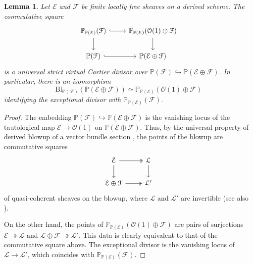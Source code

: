 \documentclass{amsart}
\numberwithin{equation}{section}
\theoremstyle{plain}
\newtheorem{lemma}[equation]{Lemma}
\theoremstyle{definition}
\newtheorem{remark}[equation]{Remark}
\let\scr=\mathcal
\let\bb=\mathbb
\def\P{\bb P}
\let\into=\hookrightarrow
\let\onto=\twoheadrightarrow
\def\Th{\mathrm{Th}}
\def\Bl{\mathrm{Bl}}
\def\MS{\mathrm{MS}}
\begin{document}
\begin{lemma}\label{lem:projquot}
Let $\scr E$ and $\scr F$ be finite locally free sheaves on a derived scheme. The commutative square
\[
\begin{tikzcd}
	\P_{\P(\scr E)}(\scr F) \ar{d} \ar[hook]{r} & \P_{\P(\scr E)}(\scr O (1) \oplus \scr F) \ar{d} \\
	\P(\scr F) \ar[hook]{r} & \P(\scr E \oplus \scr F)
\end{tikzcd}
\]
is a universal strict virtual Cartier divisor over $\P(\scr F) \into \P(\scr E \oplus \scr F)$. In particular, there is an isomorphism
\begin{equation*}
\Bl_{\P(\scr F)}(\P(\scr E \oplus \scr F)) \simeq \P_{\P(\scr E)}(\scr O (1) \oplus \scr F)
\end{equation*}
identifying the exceptional divisor with $\P_{\P(\scr E)}(\scr F)$. 
\end{lemma}


\begin{proof}
The embedding $\P(\scr F) \into \P(\scr E \oplus \scr F)$ is the vanishing locus of the tautological map $\scr E \to \scr O(1)$ on $\P(\scr E \oplus \scr F)$. Thus, by the universal property of derived blowup of a vector bundle section \cite[Proposition 2.7]{annala-chern}, the points of the blowup are commutative squares
\begin{equation*}\label{eq:qcohsq}
\begin{tikzcd}
\scr E \arrow[r,twoheadrightarrow] \arrow[d] & \scr L \arrow[d] \\
\scr E \oplus \scr F \arrow[r,twoheadrightarrow] & \scr L'
\end{tikzcd}
\end{equation*}
of quasi-coherent sheaves on the blowup, where $\scr L$ and $\scr L'$ are invertible (see also \cite[Lemma~3.2]{AHI}).

On the other hand, the points of $\P_{\P(\scr E)}(\scr O(1) \oplus \scr F)$ are pairs of surjections $\scr E \onto \scr L$ and $\scr L \oplus \scr F \onto \scr L'$. This data is clearly equivalent to that of the commutative square above. The exceptional divisor is the vanishing locus of $\scr L \to \scr L'$, which coincides with $\P_{\P(\scr E)}(\scr F)$.
\end{proof}
\end{document}
